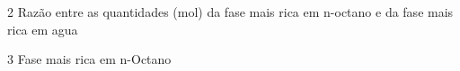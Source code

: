 \documentclass[\mainfilename]{subfiles}
\begin{document}
\begin{questionBox}2{ %
    Razão entre as quantidades (mol) da fase mais rica em n-octano e da fase mais rica em agua
} %
    \begin{questionBox}3{ %
        Fase mais rica em n-Octano
    } %
                
    \end{questionBox}
\end{questionBox}


\begin{minipage}{\textwidth}
    \phantom{1}
    \vspace{10cm}
\end{minipage}
\end{document}

